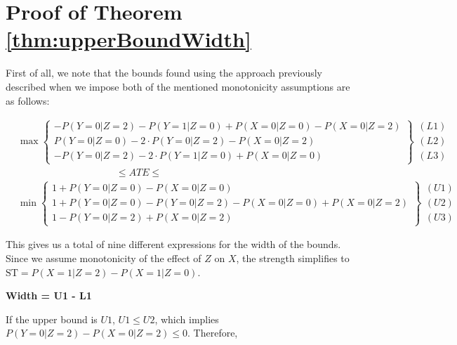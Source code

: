 \documentclass[
]{article}
\theoremstyle{plain}
\begin{document}
\newpage

\hypertarget{appendix-appendix}{%
\appendix}


\hypertarget{proof-of-theorem}{%
\section{\texorpdfstring{Proof of Theorem \ref{thm:upperBoundWidth}}{Proof of Theorem }}\label{proof-of-theorem}}

First of all, we note that the bounds found using the approach previously described when we impose both of the mentioned monotonicity assumptions are as follows:

\[
  \begin{aligned}
    &\max
      \begin{Bmatrix}
        -P(Y = 0 | Z = 2) - P(Y = 1 | Z = 0) + P(X = 0 | Z = 0) - P(X = 0 | Z = 2) \\
        P(Y = 0 | Z = 0) - 2\cdot P(Y = 0 | Z = 2) - P(X = 0 | Z = 2) \\
        -P(Y = 0 | Z = 2) - 2\cdot P(Y = 1 | Z = 0) + P(X = 0 | Z = 0)
      \end{Bmatrix} 
      \begin{matrix} (L1) \\ (L2) \\ (L3) \end{matrix}  \\
    &\qquad \qquad \qquad \qquad \qquad\le ATE \le \\
    &\min
      \begin{Bmatrix}
        1 + P(Y = 0 | Z = 0) - P(X = 0 | Z = 0) \\
        1 + P(Y = 0 | Z = 0) - P(Y = 0 | Z = 2) - P(X = 0 | Z = 0) + P(X = 0 | Z = 2) \\
        1 - P(Y = 0 | Z = 2) +  P(X = 0 | Z = 2)
      \end{Bmatrix}
      \begin{matrix} (U1) \\ (U2) \\ (U3) \end{matrix}
  \end{aligned}
\]

This gives us a total of nine different expressions for the width of the bounds. Since we assume monotonicity of the effect of \(Z\) on \(X\), the strength simplifies to \(\text{ST} = P(X = 1 | Z = 2) - P(X = 1 | Z = 0)\).

\textbf{Width = U1 - L1}

If the upper bound is \(U1\), \(U1 \le U2\), which implies \(P(Y = 0 | Z = 2) - P(X = 0 | Z = 2) \le 0\). Therefore,
\end{document}
